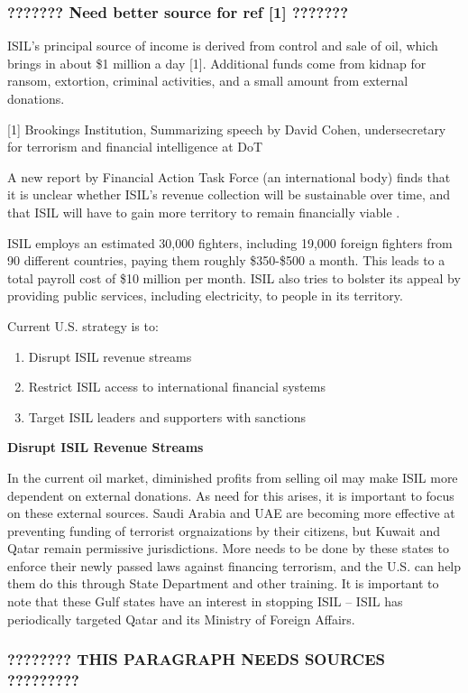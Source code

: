 \documentclass{report}
\begin{document}
\subsubsection{???????  Need better source for ref [1]    ???????}

ISIL's principal source of income is derived from control and sale of oil, which brings in about \$1 million a day [1]. Additional funds come from kidnap for ransom, extortion, criminal activities, and a small amount from external donations. 

[1]  Brookings Institution, Summarizing speech by David Cohen, undersecretary for terrorism and financial intelligence at DoT

A new report by Financial Action Task Force (an international body) finds that it is unclear whether ISIL's revenue collection will be sustainable over time, and that ISIL will have to gain more territory to remain financially viable \cite{TheEditorialBoard2015,Report2015}.

ISIL employs an estimated 30,000 fighters, including 19,000 foreign fighters from 90 different countries, paying them roughly \$350-\$500 a month. This leads to a total payroll cost of \$10 million per month. ISIL also tries to bolster its appeal by providing public services, including electricity, to people in its territory. 

Current U.S. strategy is to:

\begin{enumerate}
  \item Disrupt ISIL revenue streams
  \item Restrict ISIL access to international financial systems
  \item Target ISIL leaders and supporters with sanctions
\end{enumerate}



\textbf{Disrupt ISIL Revenue Streams}

In the current oil market, diminished profits from selling oil may make ISIL more dependent on external donations. As need for this arises, it is important to focus on these external sources. Saudi Arabia and UAE are becoming more effective at preventing funding of terrorist orgnaizations by their citizens, but Kuwait and Qatar remain permissive jurisdictions. More needs to be done by these states to enforce their newly passed laws against financing terrorism, and the U.S. can help them do this through State Department and other training. It is important to note that these Gulf states have an interest in stopping ISIL – ISIL has periodically targeted Qatar and its Ministry of Foreign Affairs. \subsubsection{???????? THIS PARAGRAPH NEEDS SOURCES   ?????????} 
\end{document}
